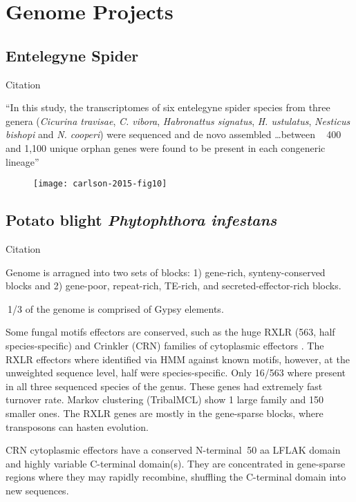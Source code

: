 \section{Genome Projects}
\subsection{Entelegyne Spider}

  Citation \cite{carlson_novo_2015}

  ``In this study, the transcriptomes of six entelegyne spider species from
  three genera (\textit{Cicurina travisae}, \textit{C. vibora},
  \textit{Habronattus signatus}, \textit{H. ustulatus}, \textit{Nesticus
    bishopi} and \textit{N.  cooperi}) were sequenced and de novo assembled
  \dots between ~ 400 and 1,100 unique orphan genes were found to be present in
  each congeneric lineage''

  \begin{figure}[!hbpt]
    \centering
    \texttt{[image: carlson-2015-fig10]}
  \end{figure}

\subsection{Potato blight \textit{Phytophthora infestans}}

  Citation \cite{haas_genome_2009}

  Genome is arragned into two sets of blocks: 1) gene-rich, synteny-conserved
  blocks and 2) gene-poor, repeat-rich, TE-rich, and secreted-effector-rich
  blocks.

  $~$1/3 of the genome is comprised of Gypsy elements.

  Some fungal motifs effectors are conserved, such as the huge RXLR (563, half
  species-specific) and Crinkler (CRN) families of cytoplasmic effectors
  \cite{haas_genome_2009}. The RXLR effectors where identified via HMM against
  known motifs, however, at the unweighted sequence level, half were
  species-specific. Only 16/563 where present in all three sequenced species of
  the genus. These genes had extremely fast turnover rate. Markov clustering
  (TribalMCL) show 1 large family and 150 smaller ones. The RXLR genes are
  mostly in the gene-sparse blocks, where transposons can hasten evolution.

  CRN cytoplasmic effectors have a conserved N-terminal $~$50 aa LFLAK domain
  and highly variable C-terminal domain(s). They are concentrated in
  gene-sparse regions where they may rapidly recombine, shuffling the
  C-terminal domain into new sequences.

